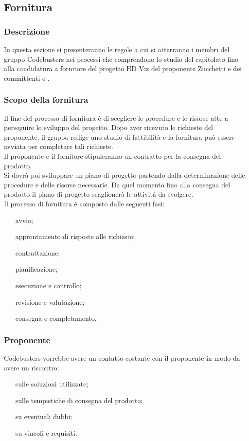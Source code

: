 \subsection{Fornitura}
\subsubsection{Descrizione}
In questa sezione si presenteranno le regole a cui si atterranno i membri del gruppo Codebusters nei processi che comprendono lo studio del capitolato fino alla candidatura a fornitore del progetto HD Viz del proponente Zucchetti e dei committenti \VT e \CR .  
\subsubsection{Scopo della fornitura}
Il fine del processo di fornitura è di scegliere le procedure e le risorse atte a perseguire lo sviluppo del progetto. Dopo aver ricevuto le richieste del proponente, il gruppo redige uno studio di fattibilità e la fornitura può essere avviata per completare tali richieste.\\
Il proponente e il fornitore stipuleranno un contratto per la consegna del prodotto.\\
Si dovrà poi sviluppare un piano di progetto partendo dalla determinazione delle procedure e delle risorse necessarie.
Da quel momento fino alla consegna del prodotto il piano di progetto scaglionerà le attività da svolgere. \\
 Il processo di fornitura è composto dalle seguenti fasi:\\
 \begin{enumerate}
 \item[avvio;] 
\item[approntamento di risposte alle richieste;]
\item[contrattazione;]
\item[pianificazione;]
\item[esecuzione e controllo;]
\item[revisione e valutazione;]
\item[consegna e completamento.]
 \end{enumerate}
\subsubsection{Proponente}
Codebusters vorrebbe avere un contatto costante con il proponente in modo da avere un riscontro:
\begin{itemize}
\item[sulle soluzioni utilizzate;]
\item[sulle tempistiche di consegna del prodotto;]
\item[su eventuali dubbi;]
\item[su vincoli e requisiti.]
\end{itemize}
